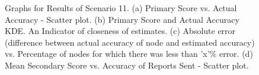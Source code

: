 \documentclass[journal]{IEEEtran}
\begin{document}
\begin{figure}[!ht]
	\caption{Graphs for Results of Scenario 11. (a) Primary Score vs. Actual Accuracy - Scatter plot. (b) Primary Score and Actual Accuracy KDE. An Indicator of closeness of estimates. (c) Absolute error (difference between actual accuracy of node and estimated accuracy) vs. Percentage of nodes for which there was less than 'x'\% error. (d) Mean Secondary Score vs. Accuracy of Reports Sent - Scatter plot.}
	\label{fig:apdx:sc11}
	\centering
	\hfill
\end{figure}
\end{document}
